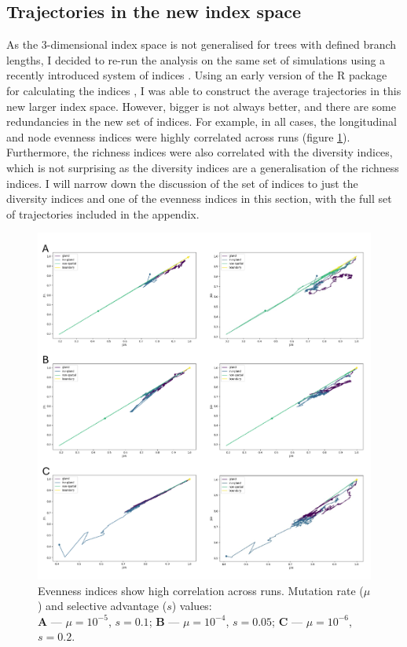 \subsection{Trajectories in the new index space}
As the $3$-dimensional index space is not generalised for trees with defined
branch lengths, I decided to re-run the analysis on the same set of simulations
using a recently introduced system of indices \cite{noble_new_2023}. Using an
early version of the R package for calculating the indices
\cite{kimverity_kimverityruiindices_2023}, I was able to construct the average
trajectories in this new larger index space. However, bigger is not always
better, and there are some redundancies in the new set of indices. For example,
in all cases, the longitudinal and node evenness indices were highly correlated
across runs (figure \ref{fig:evenness_redundant}). Furthermore, the richness
indices were also correlated with the diversity indices, which is not
surprising as the diversity indices are a generalisation of the richness
indices. I will narrow down the discussion of the set of indices to just the
diversity indices and one of the evenness indices in this section, with the
full set of trajectories included in the appendix.\par

\begin{figure}[h!]
    \centering
    \includegraphics[width=\textwidth]{Chapter_3/figures/redundancy.pdf}
    \caption{Evenness indices show high correlation across runs. Mutation rate ($\mu$) and
    selective advantage ($s$) values:\\
    \textbf{A} --- $\mu = 10^{-5}$, $s = 0.1$; \textbf{B} --- $\mu = 10^{-4}$, $s = 0.05$;
    \textbf{C} --- $\mu = 10^{-6}$, $s = 0.2$.}
    \label{fig:evenness_redundant}
\end{figure}
\clearpage


